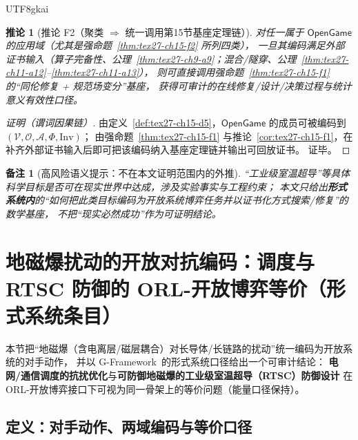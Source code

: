 \documentclass[12pt]{article}
\newtheorem{corollary}{推论}[section]
\newtheorem{remark}{备注}[section]
\newcommand{\GFramework}{\textsf{G-Framework}}
\begin{document}
\begin{CJK*}{UTF8}{gkai}
\begin{corollary}[推论 F2（聚类 $\Rightarrow$ 统一调用第15节基座定理链）]
\label{cor:tex27-ch15-f2}
对任一属于 $\mathsf{OpenGame}$ 的应用域（尤其是强命题~\ref{thm:tex27-ch15-f2} 所列四类），
一旦其编码满足外部证书输入（算子完备性、公理~\ref{thm:tex27-ch9-a9}；混合/隧穿、公理~\ref{thm:tex27-ch11-a12}--\ref{thm:tex27-ch11-a13}），
则可直接调用强命题~\ref{thm:tex27-ch15-f1} 的“同伦修复 + 规范场变分”基座，
获得可审计的在线修复/设计/决策过程与统计意义有效性口径。
\end{corollary}

\begin{proof}[证明（谓词因果链）]
由定义~\ref{def:tex27-ch15-d5}，$\mathsf{OpenGame}$ 的成员可被编码到 $(\mathcal{V},\mathcal{O},\mathcal{A},\Phi,\mathrm{Inv})$；
由强命题~\ref{thm:tex27-ch15-f1} 与推论~\ref{cor:tex27-ch15-f1}，在补齐外部证书输入后即可把该编码纳入基座定理链并输出可回放证书。
证毕。
\end{proof}

\begin{remark}[高风险语义提示：不在本文证明范围内的外推]
“工业级室温超导”等具体科学目标是否可在现实世界中达成，涉及实验事实与工程约束；
本文只给出\textbf{形式系统内}的“如何把此类目标编码为开放系统博弈任务并以证书化方式搜索/修复”的数学基座，
不把“现实必然成功”作为可证明结论。
\end{remark}

\clearpage

\section{地磁爆扰动的开放对抗编码：调度与 RTSC 防御的 ORL-开放博弈等价（形式系统条目）}
\label{sec:tex27-ch16-geomagnetic-orl-equivalence}

本节把“地磁爆（含电离层/磁层耦合）对长导体/长链路的扰动”统一编码为开放系统的对手动作，
并以 \GFramework\ 的形式系统口径给出一个可审计结论：
\textbf{电网/通信调度的抗扰优化}与\textbf{可防御地磁爆的工业级室温超导（RTSC）防御设计}
在 ORL-开放博弈接口下可视为同一骨架上的等价问题（能量口径保持）。

\subsection{定义：对手动作、两域编码与等价口径}
\label{subsec:tex27-ch16-defs}


\end{CJK*}
\end{document}

